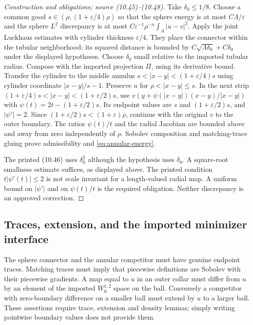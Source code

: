 \documentclass[11pt,a4paper]{article}
\numberwithin{equation}{section}
\theoremstyle{definition}
\theoremstyle{remark}
\begin{document}
\begin{proof}[Construction and obligations; source (10.45)--(10.48)]
Take $\delta_0\le1/8$. Choose a common good
$s\in(\rho,(1+\varepsilon/4)\rho)$ so that
the sphere energy is at most $C\Lambda/\varepsilon$ and the sphere
$L^2$ discrepancy is at most
$C\varepsilon^{-1}\rho^{-n}\int_A|u-v|^2$.
Apply the joint Luckhaus estimates with cylinder thickness
$\varepsilon/4$. They place the connector within the tubular neighborhood:
its squared distance is bounded by
$C\sqrt{\Lambda\delta_0}+C\delta_0$ under the displayed hypotheses.
Choose $\delta_0$ small relative to the imported tubular radius. Compose
with the imported projection $\Pi$, using its derivative bound.
Transfer the cylinder to the middle annulus
$s<|x-y|<(1+\varepsilon/4)s$ using cylinder coordinate $|x-y|/s-1$.
Preserve $u$ for $\rho<|x-y|\le s$. In the next strip
$(1+\varepsilon/4)s<|x-y|<(1+\varepsilon/2)s$, use
$v(y+\psi(|x-y|)(x-y)/|x-y|)$ with
$\psi(t)=2t-(1+\varepsilon/2)s$. Its endpoint values are $s$ and
$(1+\varepsilon/2)s$, and $|\psi'|=2$.
Since $(1+\varepsilon/2)s<(1+\varepsilon)\rho$, continue with the
original $v$ to the outer boundary. The ratios $\psi(t)/t$ and the radial
Jacobian are bounded above and away from zero independently of $\rho$.
Sobolev composition and matching-trace gluing prove admissibility and
\eqref{eq:annular-energy}.

The printed (10.46) uses $\delta_0^2$ although the hypothesis uses
$\delta_0$. A square-root smallness estimate suffices, as displayed above.
The printed condition $t|\psi'(t)|\le2$ is not scale invariant for a
length-valued radial map. A uniform bound on $|\psi'|$ and on $\psi(t)/t$
is the required obligation. Neither discrepancy is an approved correction.
\end{proof}

\subsection{Traces, extension, and the imported minimizer interface}
\label{lem:trace-gluing}
The sphere connector and the annular competitor must have genuine endpoint
traces. Matching traces must imply that piecewise definitions are Sobolev
with their piecewise gradients. A map equal to $u$ in an outer collar must
differ from $u$ by an element of the imported $W^{1,2}_0$ space on the ball.
Conversely a competitor with zero-boundary difference on a smaller ball
must extend by $u$ to a larger ball. These assertions require trace,
extension and density lemmas; simply writing pointwise boundary values
does not provide them.
\end{document}
